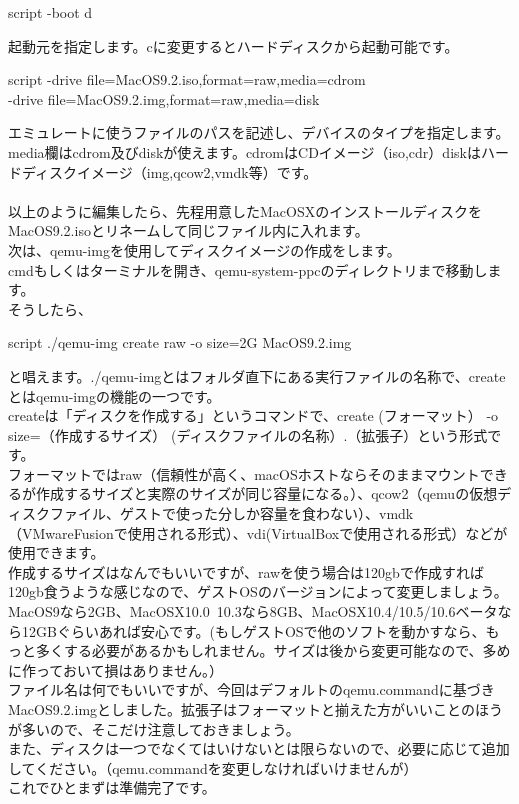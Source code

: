 \documentclass[b5paper,9pt,platex,dvipdfmx]{jsarticle}
\begin{document}
\begin{multicols*}{3}
\begin{itembox}{script}
-boot d
\end{itembox}
起動元を指定します。cに変更するとハードディスクから起動可能です。\\
\begin{itembox}{script}
-drive file=MacOS9.2.iso,format=raw,media=cdrom \ \\
-drive file=MacOS9.2.img,format=raw,media=disk 
\end{itembox}
エミュレートに使うファイルのパスを記述し、デバイスのタイプを指定します。\\
media欄はcdrom及びdiskが使えます。cdromはCDイメージ（iso,cdr）diskはハードディスクイメージ（img,qcow2,vmdk等）です。\\
\\
以上のように編集したら、先程用意したMacOSXのインストールディスクをMacOS9.2.isoとリネームして同じファイル内に入れます。\\
次は、qemu-imgを使用してディスクイメージの作成をします。\\
cmdもしくはターミナルを開き、qemu-system-ppcのディレクトリまで移動します。\\
そうしたら、
\begin{itembox}{script}
./qemu-img create raw -o size=2G MacOS9.2.img
\end{itembox}
と唱えます。./qemu-imgとはフォルダ直下にある実行ファイルの名称で、createとはqemu-imgの機能の一つです。\\
createは「ディスクを作成する」というコマンドで、create (フォーマット） -o size=（作成するサイズ） (ディスクファイルの名称）.（拡張子）という形式です。\\
フォーマットではraw（信頼性が高く、macOSホストならそのままマウントできるが作成するサイズと実際のサイズが同じ容量になる。）、qcow2（qemuの仮想ディスクファイル、ゲストで使った分しか容量を食わない）、vmdk（VMwareFusionで使用される形式）、vdi(VirtualBoxで使用される形式）などが使用できます。\\
作成するサイズはなんでもいいですが、rawを使う場合は120gbで作成すれば120gb食うような感じなので、ゲストOSのバージョンによって変更しましょう。\\
MacOS9なら2GB、MacOSX10.0~10.3なら8GB、MacOSX10.4/10.5/10.6ベータなら12GBぐらいあれば安心です。(もしゲストOSで他のソフトを動かすなら、もっと多くする必要があるかもしれません。サイズは後から変更可能なので、多めに作っておいて損はありません。）\\
ファイル名は何でもいいですが、今回はデフォルトのqemu.commandに基づきMacOS9.2.imgとしました。拡張子はフォーマットと揃えた方がいいことのほうが多いので、そこだけ注意しておきましょう。\\
また、ディスクは一つでなくてはいけないとは限らないので、必要に応じて追加してください。（qemu.commandを変更しなければいけませんが）\\
これでひとまずは準備完了です。\\

\end{multicols*}
\end{document}
